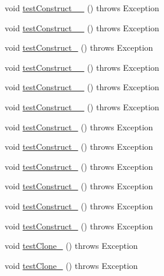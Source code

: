 \begin{DoxyCompactItemize}
\item 
void \hyperlink{classorg_1_1jgap_1_1_chromosome_test_ad805979146ecb9fd48e36ca865691cc5}{test\-Construct\-\_\-\_} ()  throws Exception 
\item 
void \hyperlink{classorg_1_1jgap_1_1_chromosome_test_a65a8db7b64fcfc43f0912a07110542ad}{test\-Construct\-\_\-\_} ()  throws Exception 
\item 
void \hyperlink{classorg_1_1jgap_1_1_chromosome_test_af8e9d87cb95ff6074cd3a020efde9d62}{test\-Construct\-\_} ()  throws Exception 
\item 
void \hyperlink{classorg_1_1jgap_1_1_chromosome_test_a9df673b85508d6fb1cbaec4c264a4008}{test\-Construct\-\_\-\_} ()  throws Exception 
\item 
void \hyperlink{classorg_1_1jgap_1_1_chromosome_test_a9a94d2d658f07f94ba22b4becb4b6ab1}{test\-Construct\-\_\-\_} ()  throws Exception 
\item 
void \hyperlink{classorg_1_1jgap_1_1_chromosome_test_ad4ac29c343a40c78c0580659fac655a7}{test\-Construct\-\_\-\_} ()  throws Exception 
\item 
void \hyperlink{classorg_1_1jgap_1_1_chromosome_test_a8a2f635714cfd5fef9a39d6548ea7d72}{test\-Construct\-\_} ()  throws Exception 
\item 
void \hyperlink{classorg_1_1jgap_1_1_chromosome_test_a32b221573379b8f8e681b444a1951166}{test\-Construct\-\_} ()  throws Exception 
\item 
void \hyperlink{classorg_1_1jgap_1_1_chromosome_test_a4ae38d775f96f5af40e1dd52db132ea6}{test\-Construct\-\_} ()  throws Exception 
\item 
void \hyperlink{classorg_1_1jgap_1_1_chromosome_test_a433ac1792bbbe37c7149d6a2a3eb63d3}{test\-Construct\-\_} ()  throws Exception 
\item 
void \hyperlink{classorg_1_1jgap_1_1_chromosome_test_a4a6262d0387b2753a6abe967701e65da}{test\-Construct\-\_} ()  throws Exception 
\item 
void \hyperlink{classorg_1_1jgap_1_1_chromosome_test_a3a46da82dd0cd16ab6b06c651c6dae30}{test\-Construct\-\_} ()  throws Exception 
\item 
void \hyperlink{classorg_1_1jgap_1_1_chromosome_test_aeb81539a86d39d9ce8e96c67ca116ab2}{test\-Clone\-\_} ()  throws Exception 
\item 
void \hyperlink{classorg_1_1jgap_1_1_chromosome_test_ad673b6e23e17b215ec5fdbcf8dc68580}{test\-Clone\-\_} ()  throws Exception 
\item 

\end{DoxyCompactItemize}
